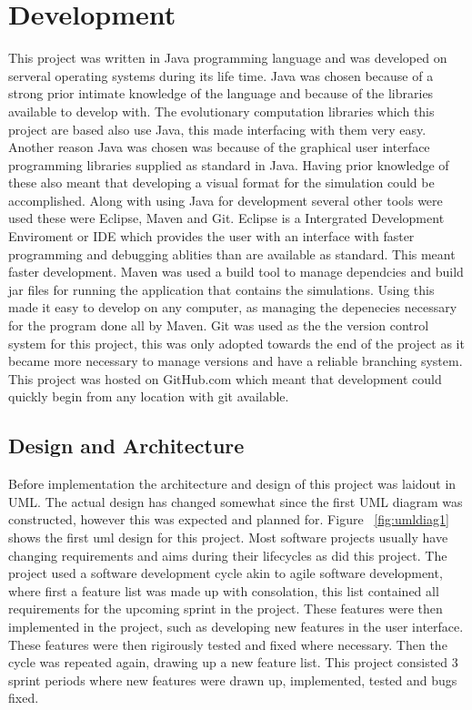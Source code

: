 \documentclass[12pt]{article}
\begin{document}
\section{Development}

This project was written in Java programming language and was developed on serveral operating systems during its life time. 
Java was chosen because of a strong prior intimate knowledge of the language and because of the libraries available to develop with. 
The evolutionary computation libraries which this project are based also use Java, this made interfacing with them very easy. 
Another reason Java was chosen was because of the graphical user interface programming libraries supplied as standard in Java. 
Having prior knowledge of these also meant that developing a visual format for the simulation could be accomplished.  Along with using 
Java for development several other tools were used these were Eclipse, Maven and Git. Eclipse is a Intergrated Development Enviroment or 
IDE which provides the user with an interface with faster programming and debugging ablities than are available as standard.
This meant faster development. Maven was used a build tool to manage dependcies and build jar files for running the application 
that contains the simulations. Using this made it easy to develop on any computer, as managing the depenecies necessary for the 
program done all by Maven. Git was used as the the version control system for this project, this was only adopted towards the 
end of the project as it became more necessary to manage versions and have a reliable branching system. This project was hosted 
on GitHub.com which meant that development could quickly begin from any location with git available. 

\subsection{Design and Architecture}

Before implementation the architecture and design of this project was laidout in UML. The actual design has changed somewhat since the first UML diagram was
constructed, however this was expected and planned for. Figure ~\ref{fig:umldiag1} shows the first uml design for this project.
Most software projects usually have changing requirements and aims during their lifecycles as did this project. The project 
used a software development cycle akin to agile software development, where first a feature list was made up with consolation, this
list contained all requirements for the upcoming sprint in the project. These features were then implemented in the project, such
as developing new features in the user interface. These features were then rigirously tested and fixed where necessary. Then 
the cycle was repeated again, drawing up a new feature list.  This project consisted 3 sprint periods where new features 
were drawn up, implemented, tested and bugs fixed.
\end{document}
